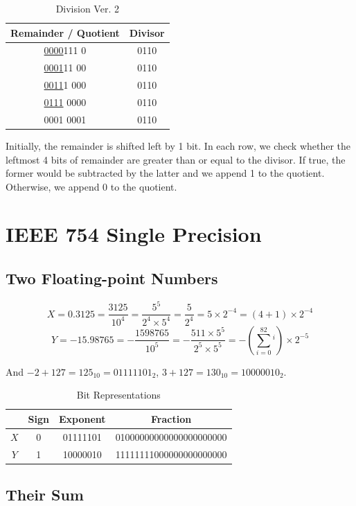 \documentclass[12pt, a4paper]{article}
\begin{document}
\begin{table}[htp]
\caption{Division Ver. 2}
\label{tab:divide2}
\centering
\begin{tabular}{cc}
\hline
Remainder / Quotient & Divisor \\
\hline
\underline{0000}111 0 & 0110 \\
\underline{0001}11 00 & 0110 \\
\underline{0011}1 000 & 0110 \\
\underline{0111} 0000 & 0110 \\
0001 0001 & 0110 \\
\hline
\end{tabular}
\end{table}

Initially, the remainder is shifted left by 1 bit. In each row, we check whether the leftmost 4 bits of remainder are greater than or equal to the divisor. If true, the former would be subtracted by the latter and we append 1 to the quotient. Otherwise, we append 0 to the quotient.

\section{IEEE 754 Single Precision}

\subsection{Two Floating-point Numbers}

$$X=0.3125=\frac{3125}{10^4}=\frac{5^5}{2^4\times5^4}=\frac{5}{2^4}=5\times2^{-4}=(4+1)\times2^{-4}$$
$$Y=-15.98765=-\frac{1598765}{10^5}=-\frac{511\times5^5}{2^5\times5^5}=-(\sum_{i=0}^82^i)\times2^{-5}$$

And $-2+127=125_{10}=01111101_2$, $3+127=130_{10}=10000010_2$.

\begin{table}[htp]
\caption{Bit Representations}
\label{tab:represent}
\centering
\begin{tabular}{cccc}
\hline
 & Sign & Exponent & Fraction \\
\hline
$X$ & 0 & 01111101 & 01000000000000000000000 \\
$Y$ & 1 & 10000010 & 11111111000000000000000 \\
\hline
\end{tabular}
\end{table}

\subsection{Their Sum}
\end{document}
